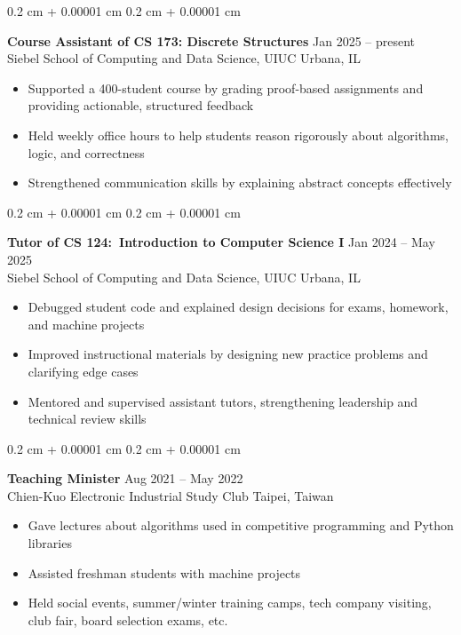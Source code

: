 \documentclass[10pt, letterpaper]{article}
\newenvironment{highlights}{
    \vspace*{2.5 pt}
    \begin{itemize}[
        topsep=0 cm,
        parsep=0 cm,
        partopsep=0pt,
        itemsep=2.5 pt,
        leftmargin=0.4 cm + 10pt
    ]
}{
    \end{itemize}
} %
\newenvironment{onecolentry}{
    \begin{adjustwidth}{
        0.2 cm + 0.00001 cm
    }{
        0.2 cm + 0.00001 cm
    }
}{
    \end{adjustwidth}
} %
\begin{document}
        \begin{onecolentry}
            \textbf{Course Assistant of CS 173: Discrete Structures} \hfill Jan 2025 -- present \\
            {Siebel School of Computing and Data Science, UIUC} \hfill {Urbana, IL}
            
            \begin{highlights}
                \item Supported a 400-student course by grading proof-based assignments and providing actionable, structured feedback
                \item Held weekly office hours to help students reason rigorously about algorithms, logic, and correctness
                \item Strengthened communication skills by explaining abstract concepts effectively
            \end{highlights}
        \end{onecolentry}

        \vspace{0.3 cm}

        \begin{onecolentry}
            \textbf{Tutor of CS 124:~Introduction to Computer Science I} \hfill Jan 2024 -- May 2025 \\
            {Siebel School of Computing and Data Science, UIUC} \hfill {Urbana, IL}
            
            \begin{highlights}
                \item Debugged student code and explained design decisions for exams, homework, and machine projects
                \item Improved instructional materials by designing new practice problems and clarifying edge cases
                \item Mentored and supervised assistant tutors, strengthening leadership and technical review skills
            \end{highlights}
        \end{onecolentry}
    
        \vspace{0.3 cm}
    
        \begin{onecolentry}
            \textbf{Teaching Minister} \hfill Aug 2021 -- May 2022 \\
            Chien-Kuo Electronic Industrial Study Club \hfill Taipei, Taiwan
    
            \begin{highlights}
                \item Gave lectures about algorithms used in competitive programming and Python libraries
                \item Assisted freshman students with machine projects
                \item Held social events, summer/winter training camps, tech company visiting, club fair, board selection exams, etc.
            \end{highlights}
        \end{onecolentry}
    
\end{document}
